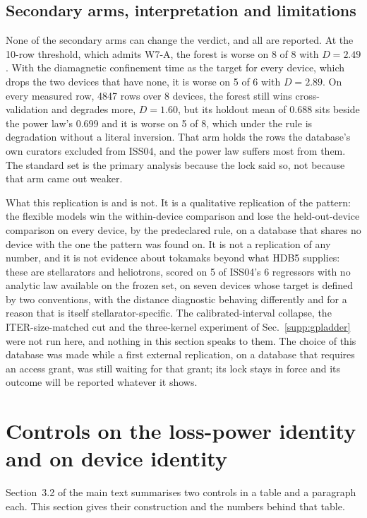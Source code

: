\documentclass[12pt,letterpaper]{article}
\begin{document}
\subsection{Secondary arms, interpretation and limitations}

None of the secondary arms can change the verdict, and all are reported. At
the 10-row threshold, which admits W7-A, the
forest is worse on
8 of
8 with
$D=2.49$.
With the diamagnetic confinement time as the target for every device, which
drops the two devices that have none, it is worse on
5
of 6
with $D=2.89$.
On every measured row, 4847 rows over
8 devices, the forest still wins
cross-validation and degrades more, $D=1.60$,
but its holdout mean of 0.688
sits beside the power law's 0.699
and it is worse on 5
of 8,
which under the rule is degradation without a literal inversion. That arm holds
the rows the database's own curators excluded from ISS04, and the power law
suffers most from them. The standard set is the primary analysis because the
lock said so, not because that arm came out weaker.

What this replication is and is not. It is a qualitative replication of the
pattern: the flexible models win the within-device comparison and lose the
held-out-device comparison on every device, by the predeclared rule, on a
database that shares no device with the one the pattern was found on. It is not
a replication of any number, and it is not evidence about tokamaks beyond what
HDB5 supplies: these are stellarators and heliotrons, scored on
5 of ISS04's 6 regressors with no analytic
law available on the frozen set, on seven devices whose target is defined by
two conventions, with the distance diagnostic behaving differently and for a
reason that is itself stellarator-specific. The calibrated-interval collapse,
the ITER-size-matched cut and the three-kernel experiment of Sec.~\ref{supp:gpladder} were not
run here, and nothing in this section speaks to them. The choice of this
database was made while a first external replication, on a database that
requires an access grant, was still waiting for that grant; its lock stays in
force and its outcome will be reported whatever it shows.

\section{Controls on the loss-power identity and on device identity}
\label{supp:controls}

Section~3.2 of the main text summarises two controls in a table and a paragraph
each. This section gives their construction and the numbers behind that table.
\end{document}
